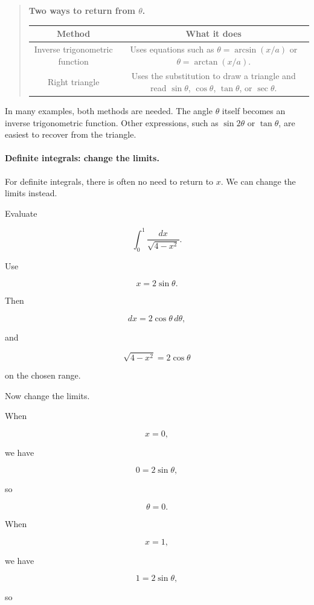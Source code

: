 \begin{quote}
\textbf{Two ways to return from \(\theta\).}

\begin{center}
\begin{tabular}{c|c}
\textbf{Method} & \textbf{What it does} \\ \hline
Inverse trigonometric function & Uses equations such as \(\theta=\arcsin(x/a)\) or \(\theta=\arctan(x/a)\). \\[5pt]
Right triangle & Uses the substitution to draw a triangle and read \(\sin\theta\), \(\cos\theta\), \(\tan\theta\), or \(\sec\theta\).
\end{tabular}
\end{center}
\end{quote}

In many examples, both methods are needed.  The angle \(\theta\) itself becomes an
inverse trigonometric function.  Other expressions, such as \(\sin2\theta\) or
\(\tan\theta\), are easiest to recover from the triangle.

\paragraph{Definite integrals: change the limits.}
For definite integrals, there is often no need to return to \(x\).  We can change the
limits instead.

Evaluate

\[
\int_0^1 \frac{dx}{\sqrt{4-x^2}}.
\]

Use

\[
x=2\sin\theta.
\]

Then

\[
dx=2\cos\theta\,d\theta,
\]

and

\[
\sqrt{4-x^2}=2\cos\theta
\]

on the chosen range.

Now change the limits.

When

\[
x=0,
\]

we have

\[
0=2\sin\theta,
\]

so

\[
\theta=0.
\]

When

\[
x=1,
\]

we have

\[
1=2\sin\theta,
\]

so

